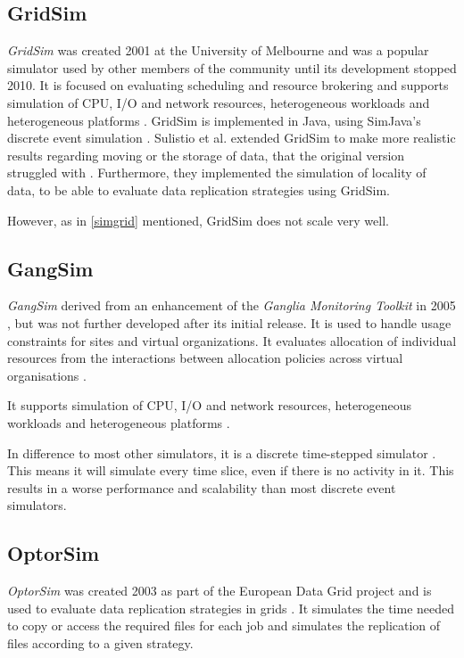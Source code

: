 \subsection{GridSim}
\label{gridsim}

\textit{GridSim} was created 2001 at the University of Melbourne and was a popular simulator used by other members of the community until its development stopped 2010.
It is focused on evaluating scheduling and resource brokering and supports simulation of CPU, I/O and network resources, heterogeneous workloads and heterogeneous platforms \cite{gridsim}. GridSim is implemented in Java, using SimJava's discrete event simulation \cite{gridsim}.
Sulistio et al. \cite{sulistio2008toolkit} extended GridSim to make more realistic results regarding moving or the storage of data, that the original version struggled with \cite{1698650}. Furthermore, they implemented the simulation of locality of data, to be able to evaluate data replication strategies using GridSim.

However, as in \cref{simgrid} mentioned, GridSim does not scale very well.

\subsection{GangSim}

\textit{GangSim} derived from an enhancement of the \textit{Ganglia Monitoring Toolkit} in 2005 \cite{dumitrescu2005gangsim}, but was not further developed after its initial release.
It is used to handle usage constraints for sites and virtual organizations. It evaluates allocation of individual resources from the interactions between allocation policies across virtual organisations \cite{dumitrescu2005gangsim}.

It supports simulation of CPU, I/O and network resources, heterogeneous workloads and heterogeneous platforms \cite{dumitrescu2005gangsim}.

In difference to most other simulators, it is a discrete time-stepped simulator \cite{dgsim}. This means it will simulate every time slice, even if there is no activity in it. This results in a worse performance and scalability than most discrete event simulators.


\newpage
\subsection{OptorSim}
\textit{OptorSim} was created 2003 as part of the European Data Grid project and is used to evaluate data replication strategies in grids \cite{optorsim}. It simulates the time needed to copy or access the required files for each job and simulates the replication of files according to a given strategy.

